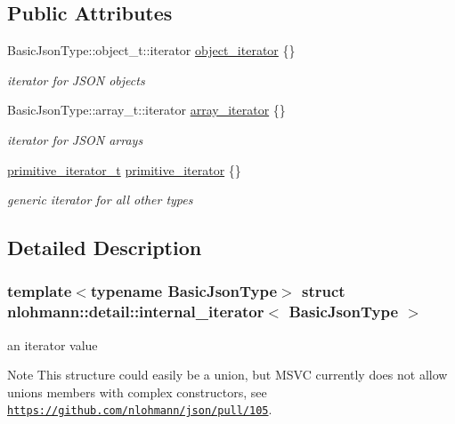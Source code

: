 \subsection*{Public Attributes}
\begin{DoxyCompactItemize}
\item 
Basic\+Json\+Type\+::object\+\_\+t\+::iterator \hyperlink{structnlohmann_1_1detail_1_1internal__iterator_a8cb0af3498061426c1d0a65ad6220408}{object\+\_\+iterator} \{\}
\begin{DoxyCompactList}\small\item\em iterator for J\+S\+ON objects \end{DoxyCompactList}\item 
Basic\+Json\+Type\+::array\+\_\+t\+::iterator \hyperlink{structnlohmann_1_1detail_1_1internal__iterator_a8294a6e6f01b58e1cce8fbae66a50b5d}{array\+\_\+iterator} \{\}
\begin{DoxyCompactList}\small\item\em iterator for J\+S\+ON arrays \end{DoxyCompactList}\item 
\hyperlink{classnlohmann_1_1detail_1_1primitive__iterator__t}{primitive\+\_\+iterator\+\_\+t} \hyperlink{structnlohmann_1_1detail_1_1internal__iterator_a2b3bb45f968210e42c282017eeeb63a8}{primitive\+\_\+iterator} \{\}
\begin{DoxyCompactList}\small\item\em generic iterator for all other types \end{DoxyCompactList}\end{DoxyCompactItemize}


\subsection{Detailed Description}
\subsubsection*{template$<$typename Basic\+Json\+Type$>$\newline
struct nlohmann\+::detail\+::internal\+\_\+iterator$<$ Basic\+Json\+Type $>$}

an iterator value 

\begin{DoxyNote}{Note}
This structure could easily be a union, but M\+S\+VC currently does not allow unions members with complex constructors, see \href{https://github.com/nlohmann/json/pull/105}{\tt https\+://github.\+com/nlohmann/json/pull/105}. 
\end{DoxyNote}


